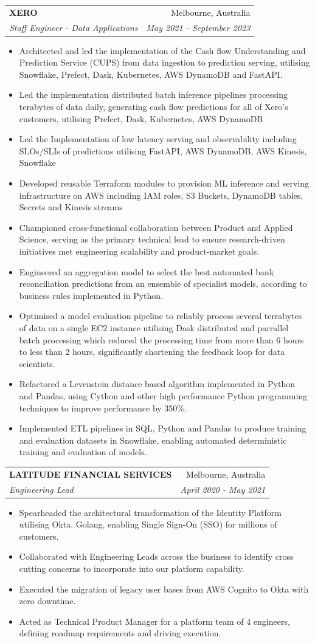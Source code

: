 \documentclass[letterpaper,11pt]{article}
\makeatletter
\newcommand{\resumeItem}[1]{
  \item\small{
    {#1 \vspace{-2pt}}
  }
}
\newcommand{\resumeSubheading}[4]{
  \vspace{-1pt}\item
    \begin{tabular*}{0.97\textwidth}[t]{l@{\extracolsep{\fill}}r}
      \textbf{#1} & #2 \\
      \textit{\small#3} & \textit{\small #4} \\
    \end{tabular*}\vspace{-7pt}
}
\newcommand{\resumeItemListStart}{\begin{itemize}}
\newcommand{\resumeItemListEnd}{\end{itemize}\vspace{0pt}}
\makeatother
\begin{document}
    \resumeSubheading
      {XERO}{Melbourne, Australia}
      {Staff Engineer - Data Applications}{May 2021 - September 2023}
      \resumeItemListStart
        \resumeItem{Architected and led the implementation of the Cash flow Understanding and Prediction Service (CUPS) from data ingestion to prediction serving, utilising Snowflake, Prefect, Dask, Kubernetes, AWS DynamoDB and FastAPI. }
        \resumeItem{Led the implementation distributed batch inference pipelines processing terabytes of data daily, generating cash flow predictions for all of Xero's customers, utilising Prefect, Dask, Kubernetes, AWS DynamoDB }
        \resumeItem{Led the Implementation of low latency serving and observability including SLOs/SLIs of predictions utilising FastAPI, AWS DynamoDB, AWS Kinesis, Snowflake}
        \resumeItem{Developed reusable Terraform modules to provision ML inference and serving infrastructure on AWS including IAM roles, S3 Buckets, DynamoDB tables, Secrets and Kinesis streams}
        \resumeItem{Championed cross-functional collaboration between Product and Applied Science, serving as the primary technical lead to ensure research-driven initiatives met engineering scalability and product-market goals.}
        \resumeItem{Engineered an aggregation model to select the best automated bank reconciliation predictions from an ensemble of specialist models, according to business rules implemented in Python.}
        \resumeItem{Optimised a model evaluation pipeline to reliably process several terrabytes of data on a single EC2 instance utilising Dask distributed and parrallel batch processing which reduced the processing time from more than 6 hours to less than 2 hours, significantly shortening the feedback loop for data scientists. }
        \resumeItem{Refactored a Levenstein distance based algorithm implemented in Python and Pandas, using Cython and other high performance Python programming techniques to improve performance by 350\%. }
        \resumeItem{Implemented ETL pipelines in SQL, Python and Pandas to produce training and evaluation datasets in Snowflake, enabling automated deterministic training and evaluation of models. }
      \resumeItemListEnd

    \resumeSubheading
      {LATITUDE FINANCIAL SERVICES}{Melbourne, Australia}
      {Engineering Lead}{April 2020 - May 2021}
      \resumeItemListStart
        \resumeItem{Spearheaded the architectural transformation of the Identity Platform utilising Okta, Golang, enabling Single Sign-On (SSO) for millions of customers.}
        \resumeItem{Collaborated with Engineering Leads across the business to identify cross cutting concerns to incorporate into our platform capability.}
        \resumeItem{Executed the migration of legacy user bases from AWS Cognito to Okta with zero downtime.}
        \resumeItem{Acted as Technical Product Manager for a platform team of 4 engineers, defining roadmap requirements and driving execution.}
      \resumeItemListEnd
\end{document}
